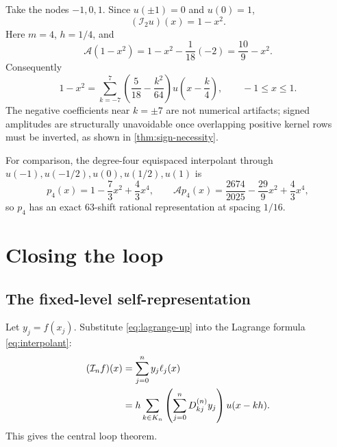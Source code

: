 \documentclass[11pt,oneside]{article}
\numberwithin{equation}{section}
\theoremstyle{definition}
\theoremstyle{remark}
\newcommand{\App}{\mathscr A}
\newcommand{\Lag}{\mathcal I}
\begin{document}
\begin{example}
\label{ex:degree-two}
Take the nodes $-1,0,1$.  Since $u(\pm1)=0$ and $u(0)=1$,
\begin{equation}
 (\Lag_2u)(x)=1-x^2.
 \label{eq:degree2-interpolant}
\end{equation}
Here $m=4$, $h=1/4$, and
\[
 \App(1-x^2)=1-x^2-\frac1{18}(-2)=\frac{10}{9}-x^2.
\]
Consequently
\begin{equation}
 \boxed{
 1-x^2=\sum_{k=-7}^{7}
 \left(\frac5{18}-\frac{k^2}{64}\right)
 u\!\left(x-\frac{k}{4}\right),
 \qquad -1\le x\le1.
 }
 \label{eq:degree2-loop}
\end{equation}
The negative coefficients near $k=\pm7$ are not numerical artifacts; signed
amplitudes are structurally unavoidable once overlapping positive kernel
rows must be inverted, as shown in \cref{thm:sign-necessity}.
\end{example}

For comparison, the degree-four equispaced interpolant through
$u(-1),u(-1/2),u(0),u(1/2),u(1)$ is
\begin{equation}
 p_4(x)=1-\frac73x^2+\frac43x^4,
 \qquad
 \App p_4(x)=\frac{2674}{2025}-\frac{29}{9}x^2+\frac43x^4,
 \label{eq:degree4-example}
\end{equation}
so $p_4$ has an exact 63-shift rational representation at spacing $1/16$.

\section{Closing the loop}
\label{sec:closing-loop}

\subsection{The fixed-level self-representation}

Let $y_j=f(x_j)$.  Substitute \eqref{eq:lagrange-up} into the Lagrange
formula \eqref{eq:interpolant}:
\begin{align}
 (\Lag_nf)(x)
 &=\sum_{j=0}^{n}y_j\ell_j(x) \notag\\
 &=h\sum_{k\in K_n}
   \left(\sum_{j=0}^{n}D_{kj}^{(n)}y_j\right)u(x-kh).
 \label{eq:loop-derivation}
\end{align}
This gives the central loop theorem.
\end{document}
